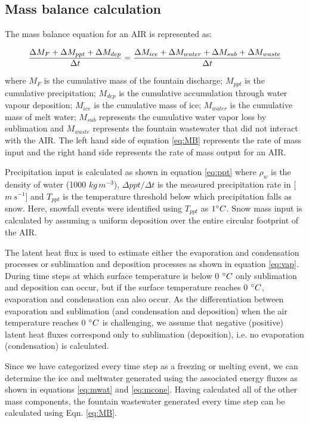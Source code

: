\documentclass[utf8]{frontiersSCNS}
\begin{document}
\subsection{Mass balance calculation}

The mass balance equation for an AIR is represented as:

\begin{equation}
	\frac{\Delta M_{F} + \Delta M_{ppt} + \Delta M_{dep}}{\Delta t} = \frac{\Delta M_{ice} +\Delta M_{water} +
		\Delta M_{sub} + \Delta M_{waste}}{\Delta t}  \\
	\label{eq:MB}
\end{equation}

where $M_{F}$ is the cumulative mass of the fountain discharge; $M_{ppt}$ is the cumulative precipitation;  $M_{dep}$ is the cumulative
accumulation through water vapour deposition; $M_{ice}$ is the cumulative mass of ice; $M_{water}$ is the cumulative
mass of melt water; $M_{sub}$ represents the cumulative water vapor loss by sublimation and $M_{waste}$ represents the
fountain wastewater that did not interact with the AIR. The left hand side of equation \ref{eq:MB} represents the rate of
mass input and the right hand side represents the rate of mass output for an AIR.

Precipitation input is calculated as shown in equation \ref{eq:ppt} where $\rho_{w}$ is the density of water (1000
$kg\,m^{-3}$), $\Delta ppt/ \Delta t$ is the measured precipitation rate in [$m\,s^{-1}$] and $T_{ppt}$ is the temperature threshold
below which precipitation falls as snow. Here, snowfall events were identified using $T_{ppt}$ as $1 \degree C$. Snow
mass input is calculated by assuming a uniform deposition over the entire circular footprint of the AIR.

The latent heat flux is used to estimate either the evaporation and condensation processes or sublimation and deposition
processes as shown in equation \ref{eq:vap}. During time steps at which surface temperature is below 0 $\degree C$ only
sublimation and deposition can occur, but if the surface temperature reaches 0 $\degree C$, evaporation and condensation
can also occur. As the differentiation between evaporation and sublimation (and condensation and deposition) when the
air temperature reaches 0 $\degree C$ is challenging, we assume that negative (positive) latent heat fluxes correspond
only to sublimation (deposition), i.e. no evaporation (condensation) is calculated.

Since we have categorized every time step as a freezing or melting event, we can determine the ice and meltwater
generated using the associated energy fluxes as shown in equations \ref{eq:mwat} and \ref{eq:mcone}. Having calculated
all of the other mass components, the fountain wastewater generated every time step can be calculated using Eqn.
\ref{eq:MB}.
\end{document}
